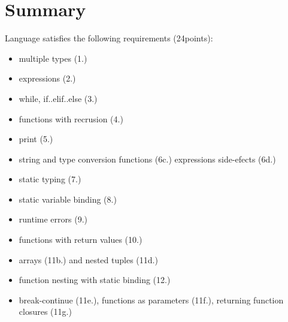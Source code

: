 \documentclass{article}
\begin{document}
\section{Summary}
Language satisfies the following requirements (24points):
\begin{itemize}
  \item multiple types (1.)
  \item expressions (2.)
  \item while, if..elif..else (3.)
  \item functions with recrusion (4.)
  \item print (5.)
  \item string and type conversion functions (6c.) expressions side-efects (6d.)
  \item static typing (7.)
  \item static variable binding (8.)
  \item runtime errors (9.)
  \item functions with return values (10.)
  \item arrays (11b.) and nested tuples (11d.)
  \item function nesting with static binding (12.)
  \item break-continue (11e.), functions as parameters (11f.), returning function
    closures (11g.)
\end{itemize}
\end{document}
